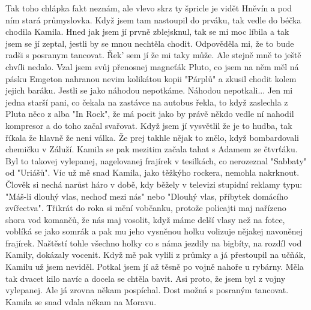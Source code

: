 
Tak toho chlápka fakt neznám, ale vlevo skrz ty špricle je vidět
Hněvín a pod ním stará průmyslovka. Když jsem tam nastoupil do prváku,
tak vedle do béčka chodila Kamila. Hned jak jsem jí prvně zblejsknul,
tak se mi moc líbila a tak jsem se jí zeptal, jestli by se mnou
nechtěla chodit. Odpověděla mi, že to bude radši s posranym tancovat.
Řek' sem jí že mi taky může. Ale stejně mně to ještě chvíli nedalo.
Vzal jsem svůj přenosnej magneťák Pluto, co jsem na něm měl ná pásku
Emgeton nahranou nevim kolikátou kopii "Párplů" a zkusil chodit kolem
jejich baráku. Jestli se jako náhodou nepotkáme. Náhodou
nepotkali... Jen mi jedna starší pani, co čekala na zastávce na autobus
řekla, to když zaslechla z Pluta něco z alba "In Rock", že má pocit
jako by právě někdo vedle ní nahodil kompresor a do toho začal
svařovat. Když jsem jí vysvětlil že je to hudba, tak říkala že hlavně
že neni válka. Že prej takhle nějak to znělo, když bombardovali
chemičku v Záluží. Kamila se pak mezitim začala tahat s Adamem ze
čtvrťáku. Byl to takovej vylepanej, nagelovanej frajírek v tesilkách,
co nerozeznal "Sabbaty" od "Uriášů". Víc už mě snad Kamila, jako
těžkýho rockera, nemohla nakrknout. Člověk si nechá narůst háro v
době, kdy běžely v televizi stupidní reklamy typu: "Máš-li dlouhý
vlas, nechoď mezi nás" nebo "Dlouhý vlas, příbytek domácího
zvířectva". Třikrát do roka si mění vobčanku, protože policajti maj
nařízeno shora vod komančů, že nás maj vosolit, když máme delší vlasy
než na fotce, voblíká se jako somrák a pak mu jeho vysněnou holku
volizuje nějakej navoněnej frajírek. Naštěstí tohle všechno holky co s
náma jezdily na bigbíty, na rozdíl vod Kamily, dokázaly vocenit. Když
mě pak vylili z průmky a já přestoupil na učňák, Kamilu už jsem
neviděl. Potkal jsem jí až těsně po vojně nahoře u rybárny. Měla tak
dvacet kilo navíc a docela se chtěla bavit. Asi proto, že jsem byl z
vojny vylepanej. Ale já zrovna někam pospíchal. Dost možná s posraným
tancovat. Kamila se snad vdala někam na Moravu.


